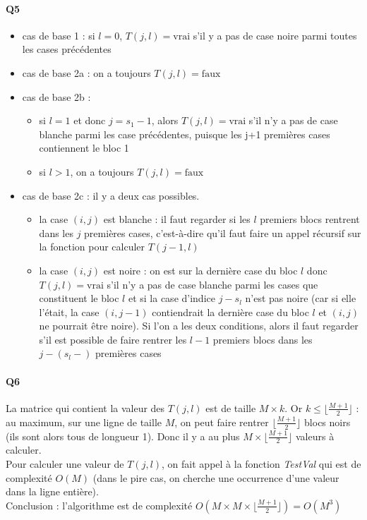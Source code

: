 \documentclass[12pt]{article}
\newcommand{\true}{\text{vrai}}
\newcommand{\false}{\text{faux}}
\begin{document}
			\paragraph{Q5}
			
				\begin{itemize}
					\item cas de base 1 : si $ l=0 $, $ T(j,l) = \true $ s'il y a pas de case noire parmi toutes les cases précédentes
					
					\item cas de base 2a : on a toujours $ T(j,l) = \false $
					
					\item cas de base 2b : \begin{itemize}
						\item si $ l=1 $ et donc $ j = s_1-1$, alors $ T(j,l) = \true $ s'il n'y a pas de case blanche parmi les case précédentes, puisque les j+1 premières cases contiennent le bloc 1
						\item si $ l > 1 $, on a toujours $ T(j,l) = \false $
					\end{itemize} 
					
					\item cas de base 2c : il y a deux cas possibles.
					\begin{itemize}
						\item la case $ (i,j) $ est blanche : il faut regarder si les $ l $ premiers blocs rentrent dans les $ j $ premières cases, c'est-à-dire qu'il faut faire un appel récursif sur la fonction pour calculer $ T(j-1,l) $
						\item la case $ (i,j) $ est noire : on est sur la dernière case du bloc $ l $ donc $ T(j,l) = \true $ s'il n'y a pas de case blanche parmi les cases que constituent le bloc $ l $ et si la case d'indice $ j-s_l $ n'est pas noire (car si elle l'était, la case $ (i,j-1) $ contiendrait la dernière case du bloc $ l $ et $ (i,j) $ ne pourrait être noire). Si l'on a les deux conditions, alors il faut regarder s'il est possible de faire rentrer les $ l-1 $ premiers blocs dans les $ j-(s_l-) $ premières cases
					\end{itemize}
			\end{itemize}
		
		\paragraph{Q6}
			La matrice qui contient la valeur des $ T(j,l) $ est de taille $ M \times k $. Or $ k \leq \lfloor \frac{M+1}{2} \rfloor $ : au maximum, sur une ligne de taille $ M $, on peut faire rentrer $ \lfloor \frac{M+1}{2} \rfloor $ blocs noirs (ils sont alors tous de longueur 1). Donc il y a au plus $ M \times \lfloor \frac{M+1}{2} \rfloor $ valeurs à calculer. \\
			Pour calculer une valeur de $ T(j,l) $, on fait appel à la fonction \textit{TestVal} qui est de complexité $ O(M) $ (dans le pire cas, on cherche une occurrence d'une valeur dans la ligne entière). \\
			Conclusion : l'algorithme est de complexité $ O(M \times M \times \lfloor \frac{M+1}{2} \rfloor) = \boxed{O(M^3)} $
		
\end{document}
